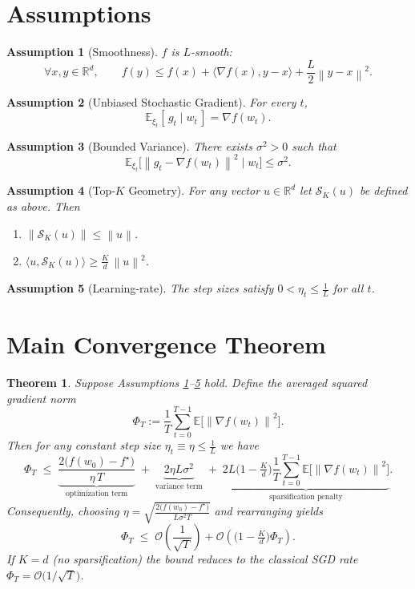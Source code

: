 \documentclass{article}
\newtheorem{theorem}{Theorem}
\newtheorem{assumption}{Assumption}
\newcommand{\E}{\mathbb{E}}
\newcommand{\R}{\mathbb{R}}
\newcommand{\norm}[1]{\left\|#1\right\|}
\newcommand{\ip}[2]{\langle #1,#2\rangle}
\newcommand{\topk}[1]{\mathcal{S}_K(#1)}
\begin{document}
\section*{Assumptions}
\begin{assumption}[Smoothness]\label{ass:smooth}
\(f\) is \(L\)-smooth:
\[
\forall x,y\in\R^{d},\qquad
f(y)\le f(x)+\ip{\nabla f(x)}{y-x}+\frac{L}{2}\norm{y-x}^2 .
\]
\end{assumption}
\begin{assumption}[Unbiased Stochastic Gradient]\label{ass:unbiased}
For every \(t\),
\[
\E_{\xi_t}[\,g_t\mid w_t\,]=\nabla f(w_t).
\]
\end{assumption}
\begin{assumption}[Bounded Variance]\label{ass:var}
There exists \(\sigma^2>0\) such that
\[
\E_{\xi_t}\bigl[\norm{g_t-\nabla f(w_t)}^2\mid w_t\bigr]\le\sigma^2 .
\]
\end{assumption}
\begin{assumption}[Top‑\(K\) Geometry]\label{ass:topk}
For any vector \(u\in\R^{d}\) let \(\topk{u}\) be defined as above. Then
\begin{enumerate}[label=(\alph*)]
    \item \(\norm{\topk{u}}\le\norm{u}\).                                 \label{prop:norm}
    \item \(\ip{u}{\topk{u}}\ge\frac{K}{d}\,\norm{u}^2\).                \label{prop:inner}
\end{enumerate}
\end{assumption}
\begin{assumption}[Learning‑rate]\label{ass:lr}
The step sizes satisfy \(0<\eta_t\le \frac{1}{L}\) for all \(t\). 
\end{assumption}

\section*{Main Convergence Theorem}
\begin{theorem}\label{thm:main}
Suppose Assumptions \ref{ass:smooth}–\ref{ass:lr} hold.  
Define the averaged squared gradient norm
\[
\Phi_T:=\frac{1}{T}\sum_{t=0}^{T-1}\E\bigl[\norm{\nabla f(w_t)}^2\bigr].
\]
Then for any constant step size \(\eta_t\equiv\eta\le \frac{1}{L}\) we have
\begin{equation}
\Phi_T\;\le\;
\underbrace{\frac{2\bigl(f(w_0)-f^\star\bigr)}{\eta\,T}}_{\text{optimization term}}
\;+\;
\underbrace{2\eta L\sigma^2}_{\text{variance term}}
\;+\;
\underbrace{2L\bigl(1-\tfrac{K}{d}\bigr)\frac{1}{T}\sum_{t=0}^{T-1}\E\!\bigl[\norm{\nabla f(w_t)}^2\bigr]}_{\text{sparsification penalty}}.
\label{eq:rate}
\end{equation}
Consequently, choosing \(\displaystyle\eta=\sqrt{\frac{2\bigl(f(w_0)-f^\star\bigr)}{L\sigma^2 T}}\) and rearranging yields
\[
\Phi_T\;\le\;
\mathcal{O}\!\left(\frac{1}{\sqrt{T}}\right)+\mathcal{O}\!\left(\bigl(1-\tfrac{K}{d}\bigr)\Phi_T\right).
\]
If \(K=d\) (no sparsification) the bound reduces to the classical SGD rate
\(\Phi_T= \mathcal{O}\bigl(1/\sqrt{T}\bigr)\).
\end{theorem}
\end{document}
